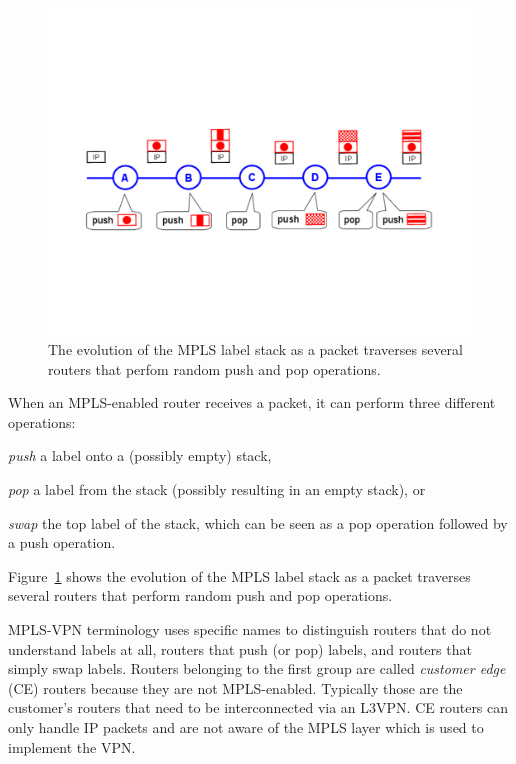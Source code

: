 \documentclass{article}
\begin{document}
\begin{figure}[tb]
\centering
 \includegraphics[trim=0cm 7cm 0cm 7cm, clip=true,
width=0.9\columnwidth]{figures/mpls-slides-28}
 \caption{The evolution of the MPLS label stack as a packet traverses several routers that perfom random push and pop operations.}
 \label{fig:mpls-slides-28}
\end{figure}


When an MPLS-enabled router receives a packet, it can perform three different 
operations:
\begin{inparaenum}[(i)]
 \item \emph{push} a label onto a (possibly empty) stack,
 \item \emph{pop} a label from the stack (possibly resulting in an empty 
stack), or
 \item \emph{swap} the top label of the stack, which can be seen as a pop 
operation followed by a push operation.
\end{inparaenum}
% 
Figure~\ref{fig:mpls-slides-28} shows the evolution of the MPLS label stack as a packet traverses several routers that perform  random push and pop operations.

MPLS-VPN terminology uses specific names to distinguish routers that do not understand 
labels at all, routers that push (or pop) labels, and routers that simply swap 
labels. 
%
Routers belonging to the first group are called \emph{customer edge} (CE) 
routers because they are not MPLS-enabled. Typically those are the customer's 
routers that need to be interconnected via an L3VPN. CE routers can only handle 
IP packets and are not aware of the MPLS layer which is used to implement the 
VPN.
\end{document}
